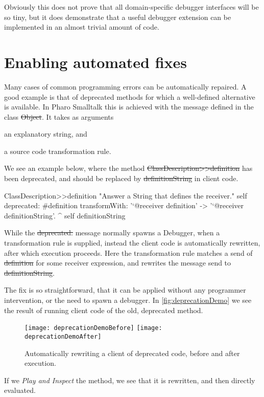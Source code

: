 \documentclass[sigplan,anonymous,review,10pt]{acmart}
\begin{document}

Obviously this does not prove that all domain-specific debugger interfaces will be so tiny, but it does demonstrate that a useful debugger extension can be implemented in an almost trivial amount of code.

\section{Enabling automated fixes}\label{sec:fixes}

Many cases of common programming errors can be automatically repaired.
A good example is that of deprecated methods for which a well-defined alternative is available.
In Pharo Smalltalk this is achieved with the  message defined in the class \st{Object}.
It takes as arguments
\begin{inparaenum}[(i)]
	\item an explanatory string, and
	\item a source code transformation rule.
\end{inparaenum}    
We see an example below, where the method \st{ClassDescription>>definition} has been deprecated, and should be replaced by \st{definitionString} in client code.
\begin{code}
ClassDescription>>definition
	"Answer a String that defines the receiver."
	self
		deprecated: #definition
		transformWith: '`@receiver definition' -> '`@receiver definitionString'.
	^ self definitionString
\end{code}
While the \st{deprecated:} message normally spawns a Debugger, when a transformation rule is supplied, instead the client code is automatically rewritten, after which execution proceeds.
Here the transformation rule matches a send of \st{definition} for some receiver expression, and rewrites the message send to \st{definitionString}.

The fix is so straightforward, that it can be applied without any programmer intervention, or the need to spawn a debugger.
In \autoref{fig:deprecationDemo} we see the result of running client code of the old, deprecated method.
\begin{figure}[h]
  \texttt{[image: deprecationDemoBefore]}
  \texttt{[image: deprecationDemoAfter]}
  \caption{Automatically rewriting a client of deprecated code, before and after execution.}
  \label{fig:deprecationDemo}
\end{figure}
If we \emph{Play and Inspect} the method, we see that it is rewritten, and then directly evaluated.
\end{document}
